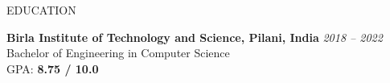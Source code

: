 \documentclass[10pt]{resume}
\begin{document}
\begin{rSection}{EDUCATION}

{\bf Birla Institute of Technology and Science, Pilani, India} \hfill {\em 2018 -- 2022} \\
Bachelor of Engineering in Computer Science \\
GPA: \textbf{8.75 / 10.0}

\end{rSection}

\end{document}
